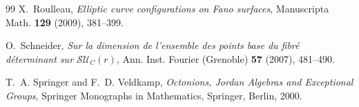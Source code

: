 \documentclass[11pt,reqno]{amsart}
\numberwithin{equation}{section}
\theoremstyle{definition}
\theoremstyle{remark}
\begin{document}
\begin{thebibliography}{99}
X.~Roulleau,
\emph{Elliptic curve configurations on Fano surfaces},
Manuscripta Math. \textbf{129} (2009), 381--399.

O.~Schneider,
\emph{Sur la dimension de l'ensemble des points base du fibr\'e d\'eterminant sur $\mathcal{SU}_C(r)$},
Ann. Inst. Fourier (Grenoble) \textbf{57} (2007), 481--490.

T.~A. Springer and F.~D. Veldkamp,
\emph{Octonions, Jordan Algebras and Exceptional Groups},
Springer Monographs in Mathematics, Springer, Berlin, 2000.

\end{thebibliography}
\end{document}
